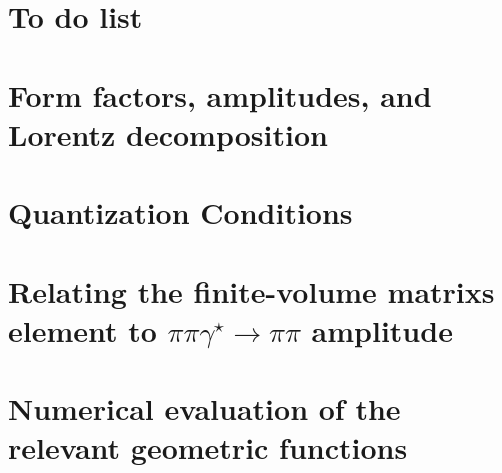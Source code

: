 \documentclass[prd,showkeys,preprintnumbers,floatfix,superscriptaddress, nofootinbib]{revtex4}
\begin{document}

\nopagebreak
\maketitle

\tableofcontents

\clearpage

\section{To do list}


\section{Form factors, amplitudes, and Lorentz decomposition}


\section{Quantization Conditions}


\section{Relating the finite-volume matrixs element to $\pi\pi\gamma^\star\to\pi\pi$ amplitude}


\section{Numerical evaluation of the relevant geometric functions}



\clearpage

\end{document}
